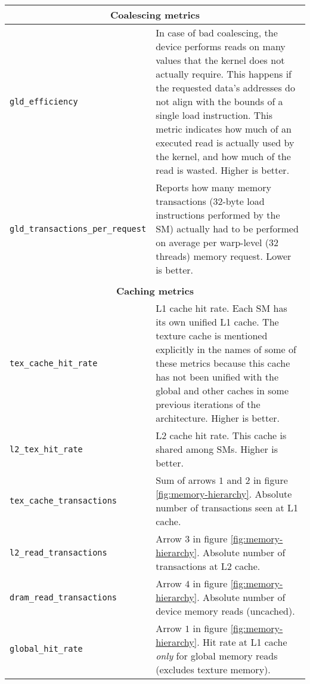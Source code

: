 \begin{center}
\begin{longtable}{p{} p{}}
    \\
    \multicolumn{2}{c}{\textbf{Coalescing metrics}} \\
    \hline
    \hline
    \raggedright \texttt{gld\_\allowbreak efficiency} & In case of bad coalescing, the device performs reads on many values that the kernel does not actually require. This happens if the requested data's addresses do not align with the bounds of a single load instruction. This metric indicates how much of an executed read is actually used by the kernel, and how much of the read is wasted. Higher is better. \\
    \hline
    \raggedright \texttt{gld\_\allowbreak transactions\_\allowbreak per\_\allowbreak request} & Reports how many memory transactions (32-byte load instructions performed by the SM) actually had to be performed on average per warp-level (32 threads) memory request. Lower is better. \\
    
    \\
    \multicolumn{2}{c}{\textbf{Caching metrics}} \\
    \hline
    \hline
    
    \raggedright \texttt{tex\_\allowbreak cache\_\allowbreak hit\_\allowbreak rate} & L1 cache hit rate. Each SM has its own unified L1 cache. The texture cache is mentioned explicitly in the names of some of these metrics because this cache has not been unified with the global and other caches in some previous iterations of the architecture. Higher is better. \\
    \hline
    \raggedright \texttt{l2\_\allowbreak tex\_\allowbreak hit\_\allowbreak rate} & L2 cache hit rate. This cache is shared among SMs. Higher is better. \\
    \hline
    \raggedright \texttt{tex\_\allowbreak cache\_\allowbreak transactions} & Sum of arrows $1$ and $2$ in figure \ref{fig:memory-hierarchy}. Absolute number of transactions seen at L1 cache. \\
    \hline
    \raggedright \texttt{l2\_\allowbreak read\_\allowbreak transactions} & Arrow $3$ in figure \ref{fig:memory-hierarchy}. Absolute number of transactions at L2 cache. \\
    \hline
    \raggedright \texttt{dram\_\allowbreak read\_\allowbreak transactions} & Arrow $4$ in figure \ref{fig:memory-hierarchy}. Absolute number of device memory reads (uncached). \\
    \hline
    \raggedright \texttt{global\_\allowbreak hit\_\allowbreak rate} & Arrow $1$ in figure \ref{fig:memory-hierarchy}. Hit rate at L1 cache \emph{only} for global memory reads (excludes texture memory). \\
    

\end{longtable}
\end{center}
